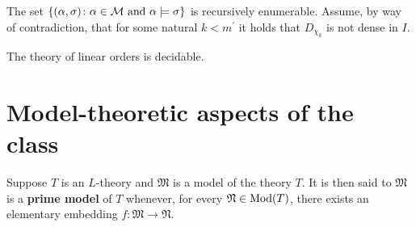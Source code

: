 \begin{lem}
	The set $\lbrace (\alpha,\sigma)\colon \alpha\in\mathcal{M}\text{ and }\alpha\models\sigma \rbrace$ is recursively enumerable.  Assume, by way of contradiction, that for some natural $k<m^\prime$ it holds that $D_{\chi_k}$ is not dense in $I$.
\end{lem}

\begin{thm}
	The theory of linear orders is decidable.
\end{thm}


\section{Model-theoretic aspects of the class \text{$\dense$}}

\begin{dfn}
	Suppose $T$ is an $L$-theory and $\mathfrak{M}$ is a model of the theory $T$. It is then said to $\mathfrak{M}$ is a \textbf{prime model} of $T$ whenever, for every $\mathfrak{N}\in\operatorname{Mod}(T)$, there exists an elementary embedding $f\colon\mathfrak{M}\to\mathfrak{N}$.
\end{dfn}

